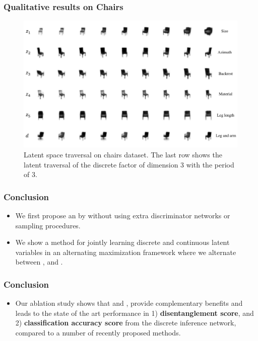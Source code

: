 \documentclass[10pt,mathserif]{beamer}
\begin{document}
\begin{frame}
\frametitle{Qualitative results on Chairs}
\begin{figure}[htbp]
\centering
\includegraphics[width=\linewidth]{dis_asset/chairs}
\caption{Latent space traversal on chairs dataset. The last row shows the latent traversal of the discrete factor of dimension 3 with the period of 3.}
\label{fig:chairs_latent_traversal}
\end{figure}
\end{frame}


\begin{frame}
\frametitle{Conclusion}
\begin{itemize}\itemsep=12pt
        \item We first propose an {\color{blue}{efficient procedure for implicitly penalizing the total correlation}} by {\color{red}{controlling the information flow on each variables}} without using extra discriminator networks or sampling procedures.
\item We show a method for jointly learning discrete and continuous latent variables in an alternating maximization framework where we alternate between {\color{blue}{finding the most likely discrete configurations based on the continuous latent variables}}, and {\color{blue}{updating the inference parameters based on the discrete variables}}. 
\end{itemize}
\end{frame}

\begin{frame}
\frametitle{Conclusion}
\begin{itemize}
    \item Our ablation study shows that {\color{blue}{information cascading}} and {\color{blue}{alternating maximization of discrete and continuous variables}}, provide complementary benefits and leads to the state of the art performance in 1) \textbf{disentanglement score}, and 2) \textbf{classification accuracy score} from the discrete inference network, compared to a number of recently proposed methods.
\end{itemize}
\end{frame}
\end{document}
